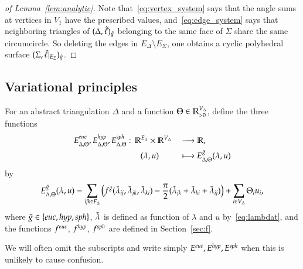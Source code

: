 \documentclass[Thesis]{subfiles}
\begin{document}
\begin{proof}[of Lemma~\ref{lem:analytic}]
  Note that~\eqref{eq:vertex_system} says that the angle sums at
  vertices in $V_{1}$ have the prescribed values,
  and~\eqref{eq:edge_system} says that neighboring triangles of
  $(\Delta,\tilde{\ell})_{\tilde{g}}$ belonging to the same face of $\Sigma$ share
  the same circumcircle. So deleting the edges in $E_{\Delta}\setminus
  E_{\Sigma}$, one obtains a cyclic polyhedral surface
  $(\Sigma,\tilde{\ell}|_{E_{\Sigma}})_{\tilde{g}}$.
\end{proof}

\subsection{Variational principles}
\label{sec:variational}

\begin{definition}
  \label{def:E}
  For an abstract triangulation $\Delta$ and a function
  $\Theta\in\mathbb R_{>0}^{V_{\Delta}}$, define the three functions
  \begin{alignat*}{2}
      E_{\Delta,\Theta}^{\euc},E_{\Delta,\Theta}^{\hyp},E_{\Delta,\Theta}^{\sph}:\,
      \R^{E_{\Delta}}&\times\R^{V_{\Delta}}&&\longrightarrow\R,\\
      (\lambda&, u)&&\longmapsto E_{\Delta,\Theta}^{\gt}(\lambda, u)
  \end{alignat*}
  by
  \begin{equation}
      \label{eq:E}
      E_{\Delta,\Theta}^{\tilde{g}}(\lambda, u) 
      = \sum_{{\it ijk}\in F_{\Delta}}\big(f^{\tilde{g}}(\tilde{\lambda}_{\it ij},\tilde{\lambda}_{\it jk},\tilde{\lambda}_{\it ki}) -
      \frac{\pi}{2}(\tilde{\lambda}_{\it jk} + \tilde{\lambda}_{\it ki} +
      \tilde{\lambda}_{\it ij})\big) + \sum_{i\in V_{\Delta}} \Theta_i u_i,    
  \end{equation}
  where $\gt\in\{\euc,\hyp,\sph\}$, $\tilde{\lambda}$ is defined as function
  of $\lambda$ and $u$ by~\eqref{eq:lambdat}, and the functions
  $f^{\euc}$, $f^{\mathit{hyp}}$, $f^{\mathit{sph}}$ are defined in Section~\ref{sec:f}.
\end{definition}

We will often omit the subscripts and write simply
$E^{\euc},E^{\hyp},E^{\sph}$ when this is unlikely to cause confusion.
\end{document}
